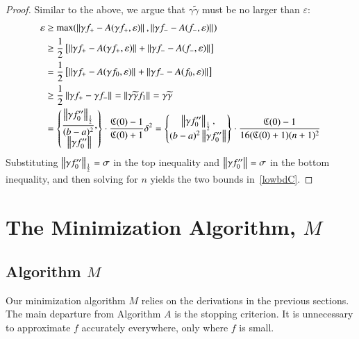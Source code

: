 \documentclass[review]{elsarticle}
\newcommand{\abstol}{\varepsilon}
\theoremstyle{definition}
\newcommand{\tgamma}{\widetilde{\gamma}}
\begin{document}
\begin{proof}
Similar to the above, we argue that $\gamma\tgamma$ must be no larger than
	$\abstol$:
	\begin{align*}
	\abstol & \ge \max(\norm{\gamma f_+-A(\gamma f_+,\abstol)},
	\norm{\gamma f_--A(f_-, \abstol)}) \\
	& \ge \frac{1}{2} \left[ \norm{\gamma f_+-A(\gamma f_+,\abstol)}
	+ \norm{\gamma f_--A(f_-, \abstol)} \right] \\
	& = \frac{1}{2} \left[ \norm{\gamma f_+-A(\gamma f_0,\abstol)}
	+ \norm{\gamma f_--A(f_0, \abstol)} \right] \\
	& \ge \frac{1}{2}  \norm{\gamma f_+ - \gamma f_-} =  \norm{\gamma \tgamma f_1} 
	= \gamma \tgamma\\
	& = \begin{Bmatrix} \displaystyle
	\frac{\norm[\frac 12]{\gamma f_0''}}{(b-a)^2}, \\
	\norm{\gamma f_0''}
	\end{Bmatrix}  \cdot \frac{\fC(0)-1}{\fC(0)+1} \delta^2 
	 = \begin{Bmatrix} \displaystyle
	\norm[\frac 12]{\gamma f_0''}, \\
	(b-a)^2\norm{\gamma f_0''}
	\end{Bmatrix}  \cdot \frac{\fC(0)-1}{16(\fC(0)+1)(n+1)^2}
	\end{align*}
	Substituting $\norm[\frac12]{\gamma f_0''} = \sigma$ in the top inequality and
	$\norm{\gamma f_0''} = \sigma$ in the bottom inequality, and then solving for
	$n$ yields the two bounds in~\eqref{lowbdC}.
\end{proof}


\section{The Minimization Algorithm, $M$} \label{sec:funmin}

\subsection{Algorithm $M$}  \label{sec:minalgo}

Our minimization algorithm $M$ relies on the derivations in the previous
sections. The main departure from Algorithm $A$ is the stopping criterion. It is
unnecessary to approximate $f$ accurately everywhere,  only where $f$ is small.
\end{document}
